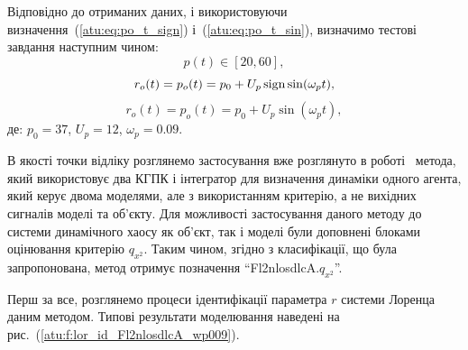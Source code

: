 Відповідно до отриманих даних, і використовуючи
визначення~(\ref{atu:eq:po_t_sign}) і~(\ref{atu:eq:po_t_sin}),
%
визначимо тестові завдання наступним чином:
\[
  p(t) \in [20, 60],
\]
%
\begin{equation}
  r_o(t) = p_o(t) = p_0 +  U_{p} \operatorname*{sign} \sin( \omega_{p} t ),
  \label{atu:eq:lor_po_t_sign}
\end{equation}
%
%
\begin{equation}
  r_o(t) = p_o(t) = p_0 +  U_{p} \sin( \omega_{p} t ),
  \label{atu:eq:lor_po_t_sin}
\end{equation}
%
де:
$p_0 = 37$, $U_p=12$, $\omega_p=0.09$.

В якості точки відліку розглянемо застосування вже розглянуто
в роботі~\cite{atu_phd_thesis}
метода, який використовує два КГПК і інтегратор для визначення динаміки одного агента,
який керує двома моделями, але з використанням критерію, а не вихідних сигналів моделі та об'єкту.
Для можливості застосування даного методу до системи
динамічного хаосу як об'єкт, так і моделі були доповнені блоками
оцінювання критерію
$ q_{x^2} $. Таким чином, згідно з класифікації, що була запропонована, метод
отримує позначення
``Fl2nlosdlcA.$q_{x^2}$''.

Перш за все, розглянемо процеси ідентифікації параметра
$ r $ системи Лоренца даним методом. Типові результати моделювання
наведені на рис.~(\ref{atu:f:lor_id_Fl2nlosdlcA_wp009}).

